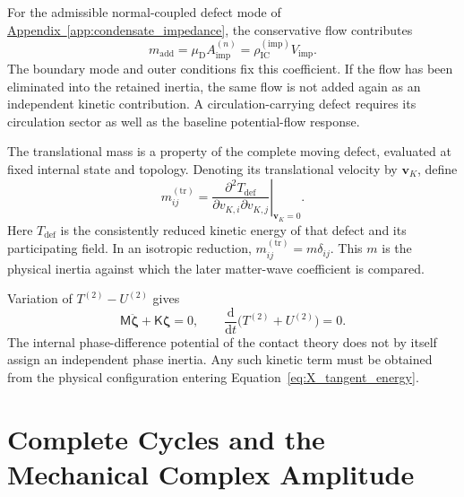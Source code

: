 For the admissible normal-coupled defect mode of \hyperref[app:condensate_impedance]{Appendix~\ref*{app:condensate_impedance}}, the conservative flow contributes
\begin{equation}
    m_{\mathrm{add}}
    =\mu_{\mathrm D}A_{\mathrm{imp}}^{(n)}
    =\rho_{\mathrm{IC}}^{(\mathrm{imp})}V_{\mathrm{imp}}.
\end{equation}
The boundary mode and outer conditions fix this coefficient. If the flow has been eliminated into the retained inertia, the same flow is not added again as an independent kinetic contribution. A circulation-carrying defect requires its circulation sector as well as the baseline potential-flow response.

The translational mass is a property of the complete moving defect, evaluated at fixed internal state and topology. Denoting its translational velocity by $\mathbf v_K$, define
\begin{equation}
    m_{ij}^{(\mathrm{tr})}
    =\left.
    \frac{\partial^2T_{\mathrm{def}}}
    {\partial v_{K,i}\partial v_{K,j}}
    \right|_{\mathbf v_K=0}.
    \label{eq:X_translation_mass}
\end{equation}
Here $T_{\mathrm{def}}$ is the consistently reduced kinetic energy of that defect and its participating field. In an isotropic reduction, $m_{ij}^{(\mathrm{tr})}=m\delta_{ij}$. This $m$ is the physical inertia against which the later matter-wave coefficient is compared.

Variation of $T^{(2)}-U^{(2)}$ gives
\begin{equation}
    \mathsf M\ddot{\boldsymbol\zeta}
    +\mathsf K\boldsymbol\zeta=0,
    \qquad
    \frac{\mathrm d}{\mathrm dt}
    \bigl(T^{(2)}+U^{(2)}\bigr)=0.
\end{equation}
The internal phase-difference potential of the contact theory does not by itself assign an independent phase inertia. Any such kinetic term must be obtained from the physical configuration entering Equation~\eqref{eq:X_tangent_energy}.

\section{Complete Cycles and the Mechanical Complex Amplitude}
\label{sec:X_cycles_and_phase}

